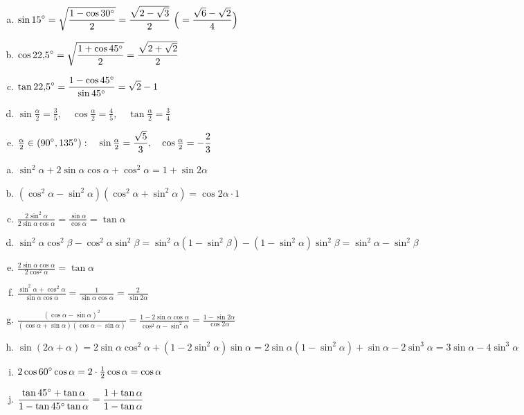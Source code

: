 \documentclass[a4paper,12pt]{letter}
\begin{document}
\begin{resitev}
\begin{enumerate}[a)]
\item $\displaystyle \sin15\degree=\sqrt{\frac{1-\cos30\degree}{2}}=\frac{\sqrt{2-\sqrt3}}{2}\ \Big(=\frac{\sqrt6-\sqrt2}{4}\Big)$
\item $\displaystyle \cos22{,}5\degree=\sqrt{\frac{1+\cos45\degree}{2}}=\frac{\sqrt{2+\sqrt2}}{2}$
\item $\displaystyle \tan22{,}5\degree=\frac{1-\cos45\degree}{\sin45\degree}=\sqrt2-1$
\item $\displaystyle \sin\tfrac{\alpha}{2}=\frac35,\quad \cos\tfrac{\alpha}{2}=\frac45,\quad \tan\tfrac{\alpha}{2}=\frac34$
\item $\displaystyle \tfrac{\alpha}{2}\in(90\degree,135\degree):\quad \sin\tfrac{\alpha}{2}=\frac{\sqrt5}{3},\quad \cos\tfrac{\alpha}{2}=-\frac23$
\end{enumerate}
\end{resitev}

\begin{resitev}
\begin{enumerate}[a)]
\item $\displaystyle \sin^2\alpha+2\sin\alpha\cos\alpha+\cos^2\alpha=1+\sin2\alpha$
\item $\displaystyle (\cos^2\alpha-\sin^2\alpha)(\cos^2\alpha+\sin^2\alpha)=\cos2\alpha\cdot1$
\item $\displaystyle \frac{2\sin^2\alpha}{2\sin\alpha\cos\alpha}=\frac{\sin\alpha}{\cos\alpha}=\tan\alpha$
\item $\displaystyle \sin^2\alpha\cos^2\beta-\cos^2\alpha\sin^2\beta=\sin^2\alpha(1-\sin^2\beta)-(1-\sin^2\alpha)\sin^2\beta=\sin^2\alpha-\sin^2\beta$
\item $\displaystyle \frac{2\sin\alpha\cos\alpha}{2\cos^2\alpha}=\tan\alpha$
\item $\displaystyle \frac{\sin^2\alpha+\cos^2\alpha}{\sin\alpha\cos\alpha}=\frac{1}{\sin\alpha\cos\alpha}=\frac{2}{\sin2\alpha}$
\item $\displaystyle \frac{(\cos\alpha-\sin\alpha)^2}{(\cos\alpha+\sin\alpha)(\cos\alpha-\sin\alpha)}=\frac{1-2\sin\alpha\cos\alpha}{\cos^2\alpha-\sin^2\alpha}=\frac{1-\sin2\alpha}{\cos2\alpha}$
\item $\displaystyle \sin(2\alpha+\alpha)=2\sin\alpha\cos^2\alpha+(1-2\sin^2\alpha)\sin\alpha=2\sin\alpha(1-\sin^2\alpha)+\sin\alpha-2\sin^3\alpha=3\sin\alpha-4\sin^3\alpha$
\item $\displaystyle 2\cos60\degree\cos\alpha=2\cdot\tfrac12\cos\alpha=\cos\alpha$
\item $\displaystyle \frac{\tan45\degree+\tan\alpha}{1-\tan45\degree\tan\alpha}=\frac{1+\tan\alpha}{1-\tan\alpha}$
\end{enumerate}
\end{resitev}
\end{document}
